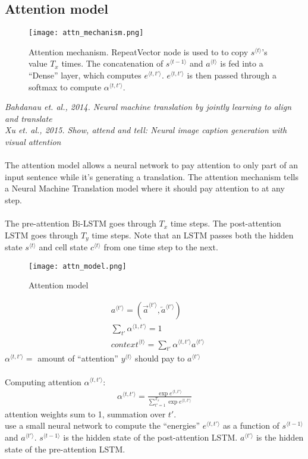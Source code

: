 %
\subsection{Attention model}
\begin{figure}[h]
    \centering
    \texttt{[image: attn\_mechanism.png]}
    \caption{Attention mechanism. RepeatVector node is used to to copy $s^{\langle t \rangle}$'s value $T_x$  times. The concatenation of $s^{\langle t-1 \rangle}$ and $a^{\langle t \rangle}$ is fed into a ``Dense'' layer, which computes $e^{\langle t, t' \rangle}$. $e^{\langle t, t' \rangle}$ is then passed through a softmax to compute $\alpha^{\langle t, t' \rangle}$.}
    \label{fig:Attentionmechanism}
\end{figure}

\textit{Bahdanau et. al., 2014. Neural machine translation by jointly learning to align and translate}\\
\textit{Xu et. al., 2015. Show, attend and tell: Neural image caption generation with visual attention}\\
\\
The attention model allows a neural network to pay attention to only part of an input sentence while it's generating a translation. The attention mechanism tells a Neural Machine Translation model where it should pay attention to at any step.\\
\\
The pre-attention Bi-LSTM goes through $T_x$  time steps. The post-attention LSTM goes through $T_y$  time steps. Note that an LSTM passes both the hidden state $s^{\langle t \rangle}$ and cell state $c^{\langle t \rangle}$ from one time step to the next.
\begin{figure}[h]
    \centering
    \texttt{[image: attn\_model.png]}
    \caption{Attention model}
    \label{fig:Attentionmodel}
\end{figure}

\begin{align}
&a^{\langle t' \rangle} = (\overrightarrow{a}^{\langle t' \rangle}, \overleftarrow{a}^{\langle t' \rangle})\\
&\sum_{t'} \alpha^{\langle 1, t' \rangle} = 1\\
&context^{\langle t \rangle } = \sum_{t'} \alpha^{\langle t, t' \rangle} a^{\langle t' \rangle} 
\end{align}
$\alpha^{\langle t, t' \rangle} = $ amount of ``attention'' $y^{\langle t \rangle }$ should pay to $a^{\langle t' \rangle}$\\
\\
Computing attention $\alpha^{\langle t, t' \rangle}$:
\begin{align}
\alpha^{\langle t, t' \rangle} = \frac{\exp{e^{\langle t, t' \rangle}}}{\sum_{t' = 1}^{T_x} \exp{e^{\langle t, t' \rangle}}}
\end{align}
attention weights sum to 1, summation over $t'$.\\
use a small neural network to compute the ``energies'' $e^{\langle t, t' \rangle}$ as a function of $s^{\langle t-1 \rangle}$ and $a^{\langle t' \rangle}$. $s^{\langle t-1 \rangle}$ is the hidden state of the post-attention LSTM. $a^{\langle t' \rangle}$ is the hidden state of the pre-attention LSTM.

